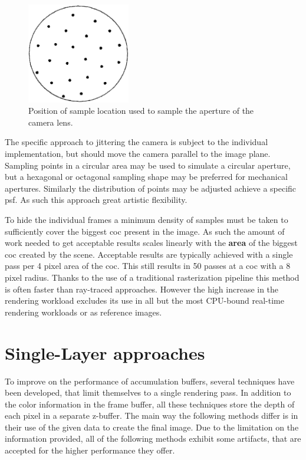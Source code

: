 \begin{figure}
\begin{center}
    \includegraphics[width=0.4\textwidth]{images/sample-locations.png}
\end{center}
\caption{Position of sample location used to sample the aperture of the camera lens. \cite{Haeberli.1990}}
\label{fig:sample-pos}
\end{figure}

The specific approach to jittering the camera is subject to the individual implementation, but should move the camera parallel to the image plane.
Sampling points in a circular area may be used to simulate a circular aperture, but a hexagonal or octagonal sampling shape may be preferred for mechanical apertures.
Similarly the distribution of points may be adjusted achieve a specific \gls{psf}.
As such this approach great artistic flexibility.

To hide the individual frames a minimum density of samples must be taken to sufficiently cover the biggest \gls{coc} present in the image.
As such the amount of work needed to get acceptable results scales linearly with the \textbf{area} of the biggest \gls{coc} created by the scene.
Acceptable results are typically achieved with a single pass per 4 pixel area of the \gls{coc}.
This still results in 50 passes at a \gls{coc} with a 8 pixel radius. \cite{Demers.2005}
Thanks to the use of a traditional rasterization pipeline this method is often faster than ray-traced approaches.
However the high increase in the rendering workload excludes its use in all but the most CPU-bound real-time rendering workloads or as reference images.

\section{Single-Layer approaches}
To improve on the performance of accumulation buffers, several techniques have been developed, that limit themselves to a single rendering pass.
In addition to the color information in the frame buffer, all these techniques store the depth of each pixel in a separate z-buffer.
The main way the following methods differ is in their use of the given data to create the final image.
Due to the limitation on the information provided, all of the following methods exhibit some artifacts, that are accepted for the higher performance they offer.

